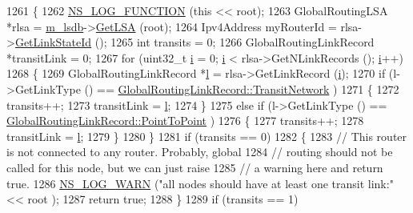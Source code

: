 \begin{DoxyCode}
1261 \{
1262   \hyperlink{log-macros-disabled_8h_a90b90d5bad1f39cb1b64923ea94c0761}{NS\_LOG\_FUNCTION} (\textcolor{keyword}{this} << root);
1263   GlobalRoutingLSA *rlsa = \hyperlink{classns3_1_1GlobalRouteManagerImpl_a7e528f818fa3e6c794b07c0b3cba5f61}{m\_lsdb}->\hyperlink{classns3_1_1GlobalRouteManagerLSDB_a3504bf3573cc64a056835684c41e1aa5}{GetLSA} (root);
1264   Ipv4Address myRouterId = rlsa->\hyperlink{classns3_1_1GlobalRoutingLSA_afc7dd85af408f8b9236bd73e1a78f5bd}{GetLinkStateId} ();
1265   \textcolor{keywordtype}{int} transits = 0;
1266   GlobalRoutingLinkRecord *transitLink = 0;
1267   \textcolor{keywordflow}{for} (uint32\_t \hyperlink{bernuolliDistribution_8m_a6f6ccfcf58b31cb6412107d9d5281426}{i} = 0; \hyperlink{bernuolliDistribution_8m_a6f6ccfcf58b31cb6412107d9d5281426}{i} < rlsa->GetNLinkRecords (); \hyperlink{bernuolliDistribution_8m_a6f6ccfcf58b31cb6412107d9d5281426}{i}++)
1268     \{
1269       GlobalRoutingLinkRecord *\hyperlink{buildings__pathloss_8m_a5b54c0a045f179bcbbbc9abcb8b5cd4c}{l} = rlsa->GetLinkRecord (\hyperlink{bernuolliDistribution_8m_a6f6ccfcf58b31cb6412107d9d5281426}{i});
1270       \textcolor{keywordflow}{if} (l->GetLinkType () == \hyperlink{classns3_1_1GlobalRoutingLinkRecord_a9380bcce9bca03943c4761b166a694f4ad3d00014c9ba50539a53b55fce117856}{GlobalRoutingLinkRecord::TransitNetwork}
      )
1271         \{
1272           transits++;
1273           transitLink = \hyperlink{buildings__pathloss_8m_a5b54c0a045f179bcbbbc9abcb8b5cd4c}{l};
1274         \}
1275       \textcolor{keywordflow}{else} \textcolor{keywordflow}{if} (l->GetLinkType () == \hyperlink{classns3_1_1GlobalRoutingLinkRecord_a9380bcce9bca03943c4761b166a694f4aa345c79cdcaba957f5e8296509183912}{GlobalRoutingLinkRecord::PointToPoint}
      )
1276         \{
1277           transits++;
1278           transitLink = \hyperlink{buildings__pathloss_8m_a5b54c0a045f179bcbbbc9abcb8b5cd4c}{l};
1279         \}
1280     \}
1281   \textcolor{keywordflow}{if} (transits == 0)
1282     \{
1283       \textcolor{comment}{// This router is not connected to any router.  Probably, global}
1284       \textcolor{comment}{// routing should not be called for this node, but we can just raise}
1285       \textcolor{comment}{// a warning here and return true.}
1286       \hyperlink{group__logging_gade7208b4009cdf0e25783cd26766f559}{NS\_LOG\_WARN} (\textcolor{stringliteral}{"all nodes should have at least one transit link:"} << root );
1287       \textcolor{keywordflow}{return} \textcolor{keyword}{true};
1288     \}
1289   \textcolor{keywordflow}{if} (transits == 1)

\end{DoxyCode}
